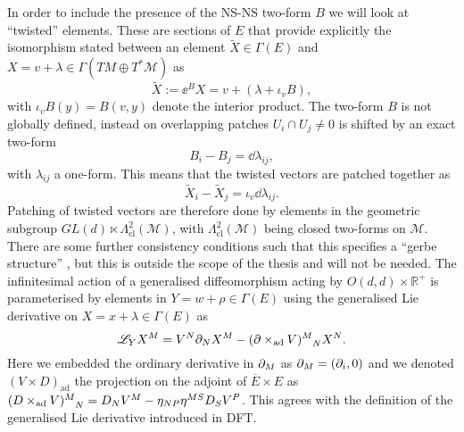 In order to include the presence of the NS-NS two-form $B$ we will look at ``twisted'' elements. These are sections of $E$ that provide explicitly the isomorphism stated between an element $\tilde{X}\in\Gamma(E)$ and $X=v+\lambda\in\Gamma(TM\oplus T^*\mathcal{M})$ as
\begin{equation}
    \tilde{X} := \ee^{B}X = v+\left(\lambda+\iota_v B\right),
\end{equation}
with $\iota_vB(y)=B(v,y)$ denote the interior product. The two-form $B$ is not globally defined, instead on overlapping patches $U_i\cap U_j\neq 0$ is shifted by an exact two-form
\begin{equation}
    B_i-B_j = \dd \lambda_{ij},
\end{equation}
with $\lambda_{ij}$ a one-form. This means that the twisted vectors are patched together as 
\begin{equation}
    \tilde{X}_i-\tilde{X}_j = \iota_v\dd \lambda_{ij}. 
\end{equation}
Patching of twisted vectors are therefore done by elements in the geometric subgroup $GL(d)\ltimes \Lambda^2_{\text{cl}}(\mathcal{M})$, with $\Lambda^2_{\text{cl}}(\mathcal{M})$ being closed two-forms on $\mathcal{M}$. There are some further consistency conditions such that this specifies a ``gerbe structure'' \cite{Hitchin:1999fh}, but this is outside the scope of the thesis and will not be needed. 
The infinitesimal action of a generalised diffeomorphism acting by $O(d,d)\times \mathbb{R}^+$ is parameterised by elements in $Y=w+\rho\in\Gamma(E)$ using the generalised Lie derivative on $X=x+\lambda\in\Gamma(E)$ as 
\begin{equation}
    \mathscr{L}_YX^M = V^N\pd_NX^M-(\pd\times_{\text{ad}} V)\tensor{}{^M_N} X^N.
\end{equation}
Here we embedded the ordinary derivative in $\partial_M$ as $\partial_M=(\partial_i,0)$ and we denoted $(V\times D)_{\text{ad}}$ the projection on the adjoint of $\overbar{E}\times E$ as  $(D\times_{\text{ad}} V)\tensor{}{^M_N}=D_NV^M-\eta_{NP}\eta^{MS}D_SV^P$. This agrees with the definition of the generalised Lie derivative introduced in DFT.


